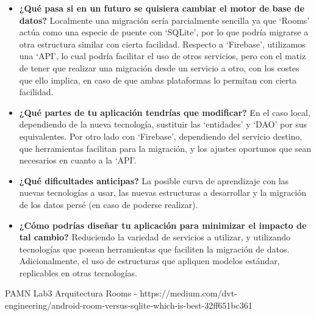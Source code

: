 \documentclass{article}
\begin{document}
    
    \begin{itemize}
        \item \textbf{¿Qué pasa si en un futuro se quisiera cambiar el motor de base de datos?}
        Localmente una migración sería parcialmente sencilla ya que \enquote*{Rooms}
         actúa como una especie de puente con \enquote*{SQLite}, por lo que podría migrarse
         a otra estructura similar con cierta facilidad. Respecto a \enquote*{Firebase}, utilizamos
         una \enquote*{API}, lo cual podría facilitar el uso de otros servicios, pero con el matiz
         de tener que realizar una migración desde un servicio a otro, con los costes que ello
         implica, en caso de que ambas plataformas lo permitan con cierta facilidad.
        \item \textbf{¿Qué partes de tu aplicación tendrías que modificar?}
        En el caso local, dependiendo de la nueva tecnología, sustituir las \enquote*{entidades} y
         \enquote*{DAO} por sus equivalentes. Por otro lado con \enquote*{Firebase}, dependiendo
         del servicio destino, que herramientas facilitan para la migración, y los ajustes
         oportunos que sean necesarios en cuanto a la \enquote*{API}.
        \item \textbf{¿Qué dificultades anticipas?}
        La posible curva de aprendizaje con las nuevas tecnologías a usar, las nuevas estructuras a
         desarrollar y la migración de los datos persé (en caso de poderse realizar).
        \item \textbf{¿Cómo podrías diseñar tu aplicación para minimizar el impacto de tal cambio?}
        Reduciendo la variedad de servicios a utilizar, y utilizando tecnologías que posean herramientas
         que faciliten la migración de datos. Adicionalmente, el uso de estructuras que apliquen modelos
         estándar, replicables en otras tecnologías.
    \end{itemize}

    \begin{thebibliography}{}
         PAMN Lab3 Arquitectura
         Rooms - https://medium.com/dvt-engineering/android-room-versus-sqlite-which-is-best-32ff651bc361
    \end{thebibliography}
        
\end{document}
